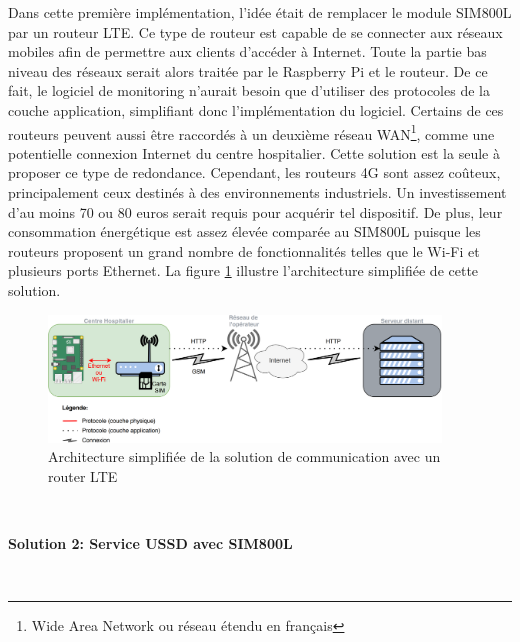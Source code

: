 \noindent
Dans cette première implémentation, l'idée était de remplacer le module SIM800L par un routeur LTE. Ce type de routeur est capable de se connecter aux réseaux mobiles afin de permettre aux clients d'accéder à Internet. Toute la partie bas niveau des réseaux serait alors traitée par le Raspberry Pi et le routeur. De ce fait, le logiciel de monitoring n'aurait besoin que d'utiliser des protocoles de la couche application, simplifiant donc l'implémentation du logiciel. Certains de ces routeurs peuvent aussi être raccordés à un deuxième réseau WAN\footnote{Wide Area Network ou réseau étendu en français}, comme une potentielle connexion Internet du centre hospitalier. Cette solution est la seule à proposer ce type de redondance. Cependant, les routeurs 4G sont assez coûteux, principalement ceux destinés à des environnements industriels. Un investissement d'au moins 70 ou 80 euros serait requis pour acquérir tel dispositif. De plus, leur consommation énergétique est assez élevée comparée au SIM800L puisque les routeurs proposent un grand nombre de fonctionnalités telles que le Wi-Fi et plusieurs ports Ethernet. La figure \ref{fig:so1} illustre l'architecture simplifiée de cette solution.

\begin{figure}[ht!]
  \centering
  \includegraphics[width=0.93\textwidth]{img/el_prototype/solution1_com.png}
  \caption{Architecture simplifiée de la solution de communication avec un router LTE}
  \label{fig:so1}
\end{figure}

~

\newpage

\textbf{Solution 2: Service USSD avec SIM800L}

\vspace{-0.2cm}
~

